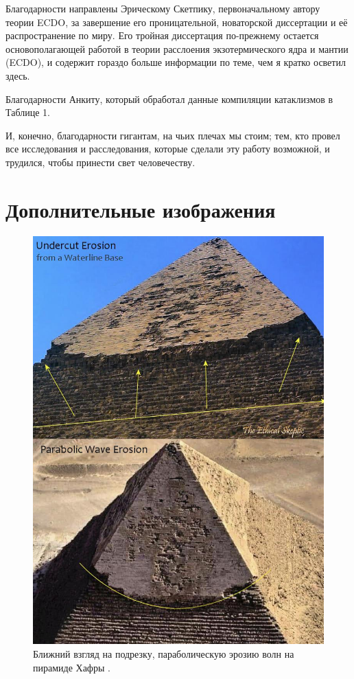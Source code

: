 \documentclass[10pt,twocolumn,letterpaper]{article}
\begin{document}
Благодарности направлены Эрическому Скетпику, первоначальному автору теории ECDO, за завершение его проницательной, новаторской диссертации и её распространение по миру. Его тройная диссертация \cite{1} по-прежнему остается основополагающей работой в теории расслоения экзотермического ядра и мантии (ECDO), и содержит гораздо больше информации по теме, чем я кратко осветил здесь.

Благодарности Анкиту, который обработал данные компиляции катаклизмов в Таблице 1.

И, конечно, благодарности гигантам, на чьих плечах мы стоим; тем, кто провел все исследования и расследования, которые сделали эту работу возможной, и трудился, чтобы принести свет человечеству.

\clearpage
\twocolumn

\section{Дополнительные изображения}

\begin{figure}[H]
\begin{center}
   \includegraphics[width=1\linewidth]{wave.jpg}
\end{center}
   \caption{Ближний взгляд на подрезку, параболическую эрозию волн на пирамиде Хафры \cite{27}.}
\label{fig:19}
\label{fig:onecol}
\end{figure}
\end{document}
